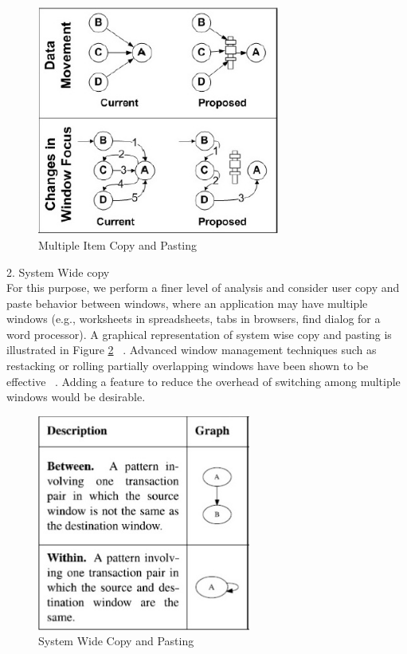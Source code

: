 \documentclass{acm_proc_article-sp}
\begin{document}
 \begin{figure}[h]
 \centering
\includegraphics[width=8cm]{MultiItem}
\caption{Multiple Item Copy and Pasting}
    \label{fig:Multi}
\end{figure} 

2. System Wide copy\\
For this purpose, we perform a finer level of analysis and consider user copy and paste behavior between windows, where an application may have multiple windows (e.g., worksheets in spreadsheets, tabs in browsers,  find dialog for a word processor). A graphical representation of system wise copy and pasting is illustrated in Figure \ref{fig:System} ~\cite{cpHabits}. Advanced window management techniques such as restacking or rolling partially overlapping windows have been shown to be effective ~\cite{overlapWindow}. Adding a feature to reduce the overhead of switching among multiple windows would be desirable.

 \begin{figure}[h]
 \centering
\includegraphics[width=7cm]{Window}
\caption{System Wide Copy and Pasting}
    \label{fig:System}
\end{figure} 
\end{document}
